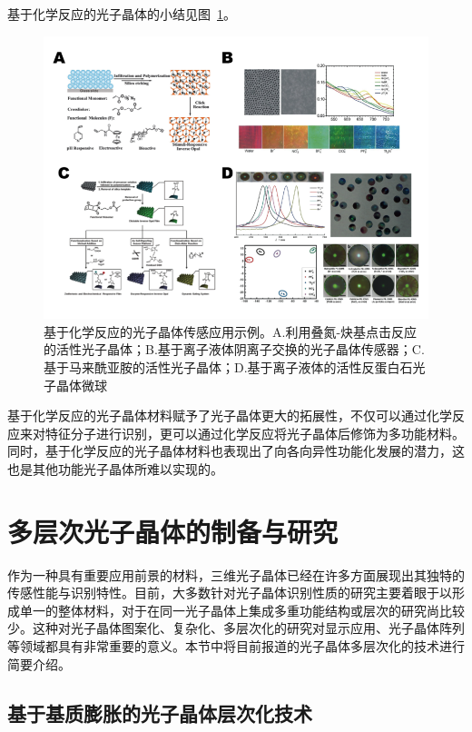 基于化学反应的光子晶体的小结见图~\ref{fig:chem_react_phc}。
\begin{figure}[htbp]
	\centering
	\includegraphics[width=\linewidth]{figures/chem_react_phc.png}
	\caption{基于化学反应的光子晶体传感应用示例。A.利用叠氮-炔基点击反应的活性光子晶体\cite{Xu2012Clickable}；B.基于离子液体阴离子交换的光子晶体传感器\cite{Huang20103DOrdered}；C.基于马来酰亚胺的活性光子晶体\cite{Yang2013MaleimideContaining}；D.基于离子液体的活性反蛋白石光子晶体微球\cite{Cui2014Inverse}}
	\label{fig:chem_react_phc}
\end{figure}
基于化学反应的光子晶体材料赋予了光子晶体更大的拓展性，不仅可以通过化学反应来对特征分子进行识别，更可以通过化学反应将光子晶体后修饰为多功能材料。同时，基于化学反应的光子晶体材料也表现出了向各向异性功能化发展的潜力\cite{Cui2014Inverse}，这也是其他功能光子晶体所难以实现的。


\section{多层次光子晶体的制备与研究}
\label{sec:multiscale-phc}

作为一种具有重要应用前景的材料，三维光子晶体已经在许多方面展现出其独特的传感性能与识别特性。目前，大多数针对光子晶体识别性质的研究主要着眼于以形成单一的整体材料，对于在同一光子晶体上集成多重功能结构或层次的研究尚比较少。这种对光子晶体图案化、复杂化、多层次化的研究对显示应用、光子晶体阵列等领域都具有非常重要的意义。本节中将目前报道的光子晶体多层次化的技术进行简要介绍。

\subsection{基于基质膨胀的光子晶体层次化技术}
\label{subsec:matrix-swell}

